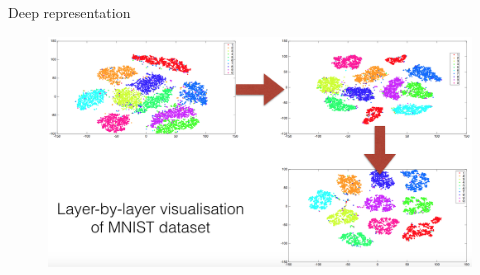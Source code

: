 \documentclass{beamer}
\begin{document}
\begin{frame}{Deep representation}

\begin{figure}[h!]
  \centering
  \includegraphics[width=1\textwidth]{images/mnist.png}
\end{figure}

\end{frame}
\end{document}
